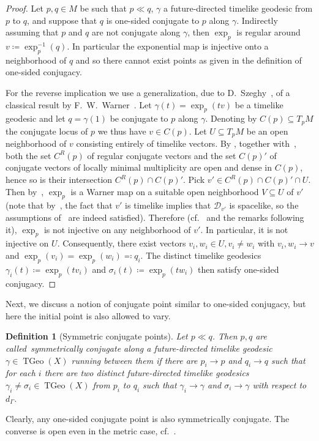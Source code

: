 \documentclass[a4paper,11pt]{article}
\numberwithin{equation}{section}
\theoremstyle{plain}
\newtheorem{Definition}{Definition}[section]
\theoremstyle{definition}
\DeclareMathOperator{\TGeo}{TGeo}
\begin{document}
\begin{proof}
Let $p,q \in M$ be such that $p\ll q$, $\gamma$ a future-directed timelike geodesic from $p$ to $q$, and suppose that $q$ is one-sided conjugate to $p$ along $\gamma$.
Indirectly assuming that $p$ and $q$ are not conjugate along $\gamma$, then $\exp_p$ is regular around $v \coloneqq \exp_p^{-1}(q)$. In particular the exponential map is injective onto a neighborhood of $q$ and so there cannot exist points as given in the definition of one-sided conjugacy.

For the reverse implication we use a generalization, due to D.\ Szeghy~\cite{szeghy2008conjugate}, of a classical result by F.~W.\ Warner~\cite{warner1965conjugate}. Let $\gamma(t) = \exp_p(tv)$ be a timelike geodesic and let $q=\gamma(1)$ be conjugate to $p$ along
$\gamma$. Denoting by $C(p)\subseteq T_pM$ the conjugate locus of $p$ we thus have $v\in C(p)$. Let $U\subseteq T_pM$ be an open neighborhood of $v$ consisting entirely of timelike vectors. By 
\cite[Thm.\ 2.1]{szeghy2008conjugate}, together with~\cite[Rem.\ 4.1]{szeghy2008conjugate}, both the set $C^R(p)$ of
regular conjugate vectors and the set $C(p)'$ of conjugate vectors of locally minimal multiplicity
are open and dense in $C(p)$, hence so is their intersection $C^R(p)\cap C(p)'$.
Pick $v'\in C^R(p)\cap C(p)'\cap U$. Then by~\cite[Lem.\ 4.2]{szeghy2008conjugate}, $\exp_p$ is a Warner map on a suitable open neighborhood $V\subseteq U$ of $v'$ (note that by~\cite[Sec.\ 5]{szeghy2008conjugate}, the fact that $v'$ is timelike implies that $\mathcal{D}_{v'}$ is spacelike, so the assumptions of~\cite[Lem.\ 4.2]{szeghy2008conjugate} are indeed satisfied). Therefore (cf.\ \cite[Thm.\ 2.2]{szeghy2008conjugate} and the remarks following it), $\exp_p$ is not injective on any neighborhood of $v'$. In particular, it is not injective on $U$.
Consequently, there exist vectors $v_i, w_i \in U, v_i\neq w_i$ with $v_i, w_i\to v$ and $\exp_p(v_i)=\exp_p(w_i) \eqqcolon q_i$. The distinct timelike geodesics $\gamma_i(t) \coloneqq \exp_p(t v_i)$ and $\sigma_i(t) \coloneqq \exp_p(t w_i)$ then satisfy one-sided conjugacy.
\end{proof}

Next, we discuss a notion of conjugate point similar to one-sided conjugacy, but here the initial point is also allowed to vary.

\begin{Definition}[Symmetric conjugate points]
Let $p\ll q$. Then $p,q$ are called~\emph{symmetrically conjugate} along a future-directed timelike geodesic $\gamma \in \TGeo(X)$ running between them if there are $p_i \to p$ and $q_i \to q$ such that for each $i$ there are two distinct future-directed timelike geodesics $\gamma_i \neq \sigma_i \in \TGeo(X)$ from $p_i$ to $q_i$ such that $\gamma_i \to \gamma$ and $\sigma_i \to \gamma$ with respect to $d_{\Gamma}$.
\end{Definition}
Clearly, any one-sided conjugate point is also symmetrically conjugate. The converse is open even in the metric case, cf.\ \cite[Open Problem 2.5]{shankar2009conjugate}.
\end{document}
